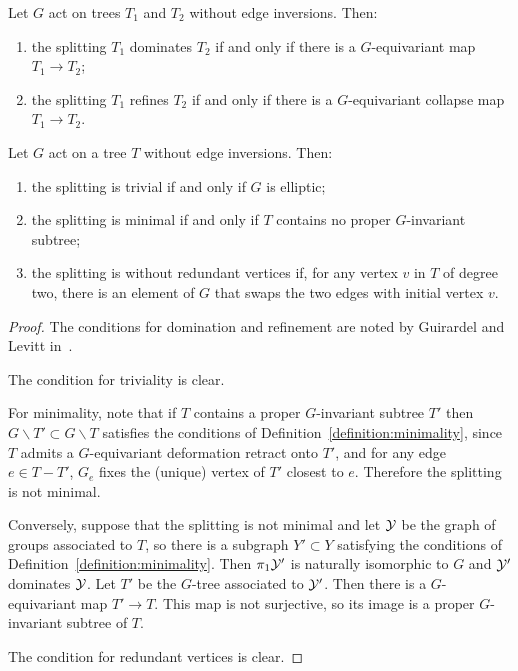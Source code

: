 \begin{lemma}\label{lemma:minimality_through_trees}
  Let $G$ act on trees $T_1$ and $T_2$ without edge inversions. 
  Then:
  \begin{enumerate}
    \item the splitting $T_1$ dominates $T_2$ if and only if there is a $G$-equivariant map $T_1 \to T_2$;
    \item the splitting $T_1$ refines $T_2$ if and only if there is a $G$-equivariant collapse map $T_1 \to T_2$.
  \end{enumerate}

  Let $G$ act on a tree $T$ without edge inversions.
  Then:
  \begin{enumerate}
    \item the splitting is trivial if and only if $G$ is elliptic;
    \item the splitting is minimal if and only if $T$ contains no proper $G$-invariant subtree;
    \item the splitting is without redundant vertices if, for any vertex $v$ in $T$ of degree two, there is an element of $G$ that swaps the two edges with initial vertex $v$.
  \end{enumerate}
\end{lemma}

\begin{proof}
  The conditions for domination and refinement are noted by Guirardel and Levitt in~\cite[Section 1.4.1--1.4.2]{guirardellevitt17}.

  The condition for triviality is clear.

  For minimality, note that if $T$ contains a proper $G$-invariant subtree $T'$ then $G \backslash T' \subset G \backslash T$ satisfies the conditions of Definition~\ref{definition:minimality}, since $T$ admits a $G$-equivariant deformation retract onto $T'$, and for any edge $e \in T - T'$, $G_e$ fixes the (unique) vertex of $T'$ closest to $e$.
  Therefore the splitting is not minimal.

  Conversely, suppose that the splitting is not minimal and let $\mathcal{Y}$ be the graph of groups associated to $T$, so there is a subgraph $Y' \subset Y$ satisfying the conditions of Definition~\ref{definition:minimality}.
  Then $\pi_1\mathcal{Y}'$ is naturally isomorphic to $G$ and $\mathcal{Y}'$ dominates $\mathcal{Y}$.
  Let $T'$ be the $G$-tree associated to $\mathcal{Y}'$.
  Then there is a $G$-equivariant map $T' \to T$.
  This map is not surjective, so its image is a proper $G$-invariant subtree of $T$.

  The condition for redundant vertices is clear.
\end{proof}

